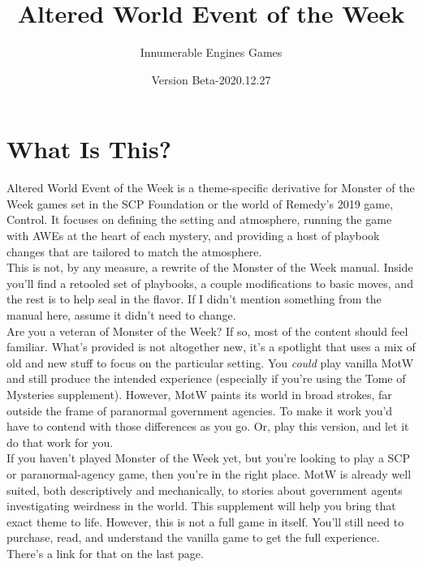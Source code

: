 \documentclass[10pt,oneside,landscape]{memoir}
\begin{document}
\title{Altered World Event of the Week}
\author{Innumerable Engines Games}
\date{Version Beta-2020.12.27}
\maketitle
\pagebreak

\fontsize{12}{14}\selectfont

\chapter*{What Is This?}
\begin{multicols}{2}

Altered World Event of the Week is a theme-specific derivative for Monster of the Week games set in the SCP Foundation or the world of Remedy’s 2019 game, Control.  It focuses on defining the setting and atmosphere, running the game with AWEs at the heart of each mystery, and providing a host of playbook changes that are tailored to match the atmosphere.
\\[4mm]
This is not, by any measure, a rewrite of the Monster of the Week manual.  Inside you'll find a retooled set of playbooks, a couple modifications to basic moves, and the rest is to help seal in the flavor.  If I didn’t mention something from the manual here, assume it didn’t need to change.
\\[4mm]
Are you a veteran of Monster of the Week?  If so, most of the content should feel familiar.  What's provided is not altogether new, it's a spotlight that uses a mix of old and new stuff to focus on the particular setting.  You \textit{could} play vanilla MotW and still produce the intended experience (especially if you’re using the Tome of Mysteries supplement).  However, MotW paints its world in broad strokes, far outside the frame of paranormal government agencies.  To make it work you’d have to contend with those differences as you go.  Or, play this version, and let it do that work for you.
\\[4mm]
If you haven’t played Monster of the Week yet, but you’re looking to play a SCP or paranormal-agency game, then you’re in the right place.  MotW is already well suited, both descriptively and mechanically, to stories about government agents investigating weirdness in the world. This supplement will help you bring that exact theme to life.  However, this is not a full game in itself.  You’ll still need to purchase, read, and understand the vanilla game to get the full experience.  There’s a link for that on the last page.


\end{multicols}
\end{document}
